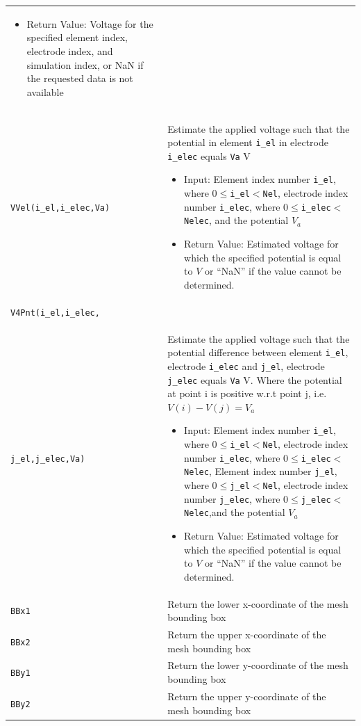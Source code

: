 \documentclass[noshowpacs,preprintnumbers,amsmath,amssymb, letter]{revtex4}
\begin{document}
\begin{longtable}{p{}p{}}
\begin{itemize}
\item Return Value: Voltage for the specified element index, electrode index, and simulation index, or NaN if the requested data is not available
\end{itemize}\\
\texttt{VVel(i\_el,i\_elec,Va)}	& Estimate the applied voltage such that the potential in element \texttt{i\_el} in electrode \texttt{i\_elec} equals \texttt{Va} V
\begin{itemize}
\item Input: Element index number \texttt{i\_el}, where $0 \le $\texttt{i\_el}$ < $\texttt{Nel}, electrode index number \texttt{i\_elec}, where $0 \le $\texttt{i\_elec}$ < $\texttt{Nelec}, and the potential $V_a$ 
\item Return Value:  Estimated voltage for which the specified potential is equal to $V$ or ``NaN'' if the value cannot be determined.
\end{itemize}\\
\texttt{V4Pnt(i\_el,i\_elec,}\\\hspace{28pt}\texttt{j\_el,j\_elec,Va)}	& Estimate the applied voltage such that the potential difference between element \texttt{i\_el}, electrode \texttt{i\_elec} and \texttt{j\_el}, electrode \texttt{j\_elec} equals \texttt{Va} V. Where the potential at point i is positive w.r.t point j, i.e. $V(i)-V(j)=V_a$
\begin{itemize}
\item Input: Element index number \texttt{i\_el}, where $0 \le $\texttt{i\_el}$ < $\texttt{Nel}, electrode index number \texttt{i\_elec}, where $0 \le $\texttt{i\_elec}$ < $\texttt{Nelec}, Element index number \texttt{j\_el}, where $0 \le $\texttt{j\_el}$ < $\texttt{Nel}, electrode index number \texttt{j\_elec}, where $0 \le $\texttt{j\_elec}$ < $\texttt{Nelec},and the potential $V_a$ 
\item Return Value:  Estimated voltage for which the specified potential is equal to $V$ or ``NaN'' if the value cannot be determined.
\end{itemize}\\
\texttt{BBx1}		& Return the lower x-coordinate of the mesh bounding box \\
\texttt{BBx2}		& Return the upper x-coordinate of the mesh bounding box \\
\texttt{BBy1}		& Return the lower y-coordinate of the mesh bounding box \\
\texttt{BBy2}		& Return the upper y-coordinate of the mesh bounding box \\

\end{longtable}
\end{document}
